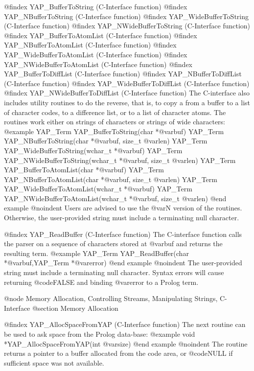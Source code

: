 {{{{{{{{{@findex YAP_BufferToString (C-Interface function)
@findex YAP_NBufferToString (C-Interface function)
@findex YAP_WideBufferToString (C-Interface function)
@findex YAP_NWideBufferToString (C-Interface function)
@findex YAP_BufferToAtomList (C-Interface function)
@findex YAP_NBufferToAtomList (C-Interface function)
@findex YAP_WideBufferToAtomList (C-Interface function)
@findex YAP_NWideBufferToAtomList (C-Interface function)
@findex YAP_BufferToDiffList (C-Interface function)
@findex YAP_NBufferToDiffList (C-Interface function)
@findex YAP_WideBufferToDiffList (C-Interface function)
@findex YAP_NWideBufferToDiffList (C-Interface function)
The C-interface also includes utility routines to do the reverse, that
is, to copy a from a buffer to a list of character codes, to a
difference list,  or to a list of
character atoms. The routines work either on strings of characters or
strings of wide characters:
@example
      YAP_Term YAP_BufferToString(char *@var{buf})
      YAP_Term YAP_NBufferToString(char *@var{buf}, size_t @var{len})
      YAP_Term YAP_WideBufferToString(wchar_t *@var{buf})
      YAP_Term YAP_NWideBufferToString(wchar_t *@var{buf}, size_t @var{len})
      YAP_Term YAP_BufferToAtomList(char *@var{buf})
      YAP_Term YAP_NBufferToAtomList(char *@var{buf}, size_t @var{len})
      YAP_Term YAP_WideBufferToAtomList(wchar_t *@var{buf})
      YAP_Term YAP_NWideBufferToAtomList(wchar_t *@var{buf}, size_t @var{len})
@end example
@noindent
Users are advised to use the @var{N} version of the routines. Otherwise,
the user-provided string must include a terminating null character.

@findex YAP_ReadBuffer (C-Interface function)
The C-interface function calls the parser on a sequence of characters
stored at @var{buf} and returns the resulting term.
@example
      YAP_Term YAP_ReadBuffer(char *@var{buf},YAP_Term *@var{error})
@end example
@noindent
The user-provided string must include a terminating null
character. Syntax errors will cause returning @code{FALSE} and binding
@var{error} to a Prolog term.

@node Memory Allocation, Controlling Streams, Manipulating Strings, C-Interface
@section Memory Allocation

@findex YAP_AllocSpaceFromYAP (C-Interface function)
The next routine can be used to ask space from the Prolog data-base:
@example
      void      *YAP_AllocSpaceFromYAP(int @var{size})
@end example
@noindent
The routine returns a pointer to a buffer allocated from the code area,
or @code{NULL} if sufficient space was not available.

}}}}}}}}}
